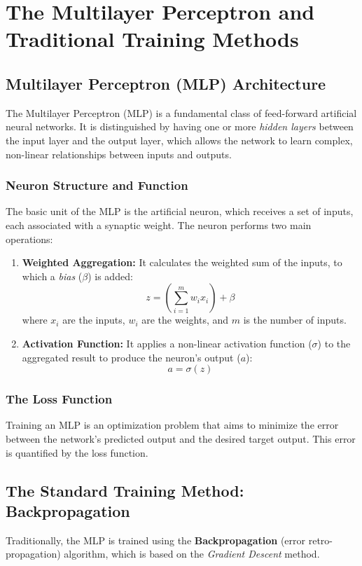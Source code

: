 \chapter{The Multilayer Perceptron and Traditional Training Methods}
\label{chap:mlp_intro}

\section{Multilayer Perceptron (MLP) Architecture}
The Multilayer Perceptron (MLP) is a fundamental class of feed-forward artificial neural networks. It is distinguished by having one or more \textit{hidden layers} between the input layer and the output layer, which allows the network to learn complex, non-linear relationships between inputs and outputs.

\subsection{Neuron Structure and Function}
The basic unit of the MLP is the artificial neuron, which receives a set of inputs, each associated with a synaptic weight. The neuron performs two main operations:
\begin{enumerate}
    \item \textbf{Weighted Aggregation:} It calculates the weighted sum of the inputs, to which a \textit{bias} ($\beta$) is added:
    $$z = \left(\sum_{i=1}^{m} w_i x_i\right) + \beta$$
    where $x_i$ are the inputs, $w_i$ are the weights, and $m$ is the number of inputs.
    \item \textbf{Activation Function:} It applies a non-linear activation function ($\sigma$) to the aggregated result to produce the neuron's output ($a$):
    $$a = \sigma(z)$$
\end{enumerate}

\subsection{The Loss Function}
Training an MLP is an optimization problem that aims to minimize the error between the network's predicted output and the desired target output. This error is quantified by the loss function.

\section{The Standard Training Method: Backpropagation}
Traditionally, the MLP is trained using the \textbf{Backpropagation} (error retro-propagation) algorithm, which is based on the \textit{Gradient Descent} method.


